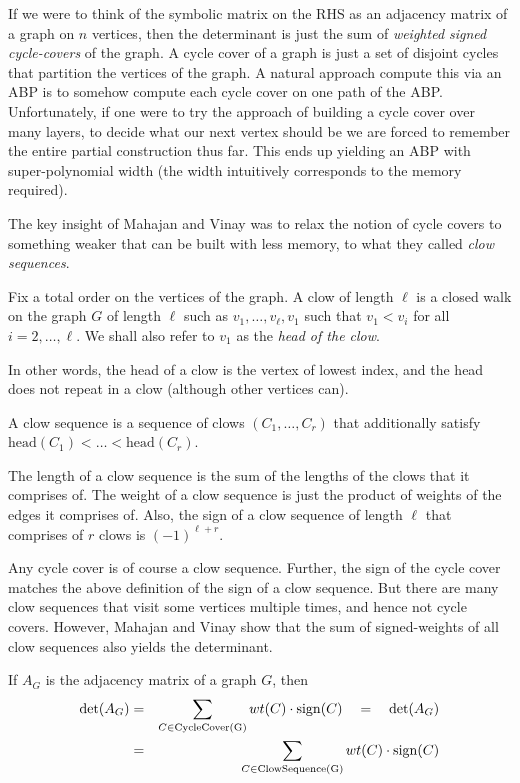 If we were to think of the symbolic matrix on the RHS as an adjacency matrix of a graph on $n$ vertices, then the determinant is just the sum of \emph{weighted signed cycle-covers} of the graph. A cycle cover of a graph is just a set of disjoint cycles that partition the vertices of the graph. A natural approach compute this via an ABP is to somehow compute each cycle cover on one path of the ABP. Unfortunately, if one were to try the \naive approach of building a cycle cover over many layers, to decide what our next vertex should be we are forced to remember the entire partial construction thus far. This ends up yielding an ABP with super-polynomial width (the width intuitively corresponds to the memory required). 

The key insight of Mahajan and Vinay was to relax the notion of cycle covers to something weaker that can be built with less memory, to what they called \emph{clow sequences}. 

\begin{definition}
Fix a total order on the vertices of the graph. A clow  of length $\ell$ is a closed walk on the graph $G$ of length $\ell$ such as $v_1,\dots, v_\ell,v_1$ such that $v_1 < v_i$ for all $i=2,\dots, \ell$. We shall also refer to $v_1$ as the \emph{head of the clow}. 

In other words, the head of a clow is the vertex of lowest index, and the head does not repeat in a clow (although other vertices can). 

A clow sequence is a sequence of clows $(C_1,\dots, C_r)$ that additionally satisfy $\mathrm{head}(C_1) < \dots < \mathrm{head}(C_r)$. 

The length of a clow sequence is the sum of the lengths of the clows that it comprises of. The weight of a clow sequence is just the product of weights of the edges it comprises of. Also, the sign of a clow sequence of length $\ell$ that comprises of $r$ clows is $(-1)^{\ell + r}$. 
\end{definition}

Any cycle cover is of course a clow sequence. Further, the sign of the cycle cover matches the above definition of the sign of a clow sequence. But there are many clow sequences that visit some vertices multiple times, and hence not cycle covers. However, Mahajan and Vinay show that the sum of signed-weights of all clow sequences also yields the determinant. 

\begin{theorem}[\cite{mv97}] If $A_G$ is the adjacency matrix of a graph $G$, then
\begin{eqnarray*}
\det(A_G) & = &  \sum_{C \in \mathrm{CycleCover(G)}} wt(C) \cdot \mathrm{sign}(C) \quad = \quad \det(A_G)\\
& = & \sum_{C \in \mathrm{ClowSequence(G)}} wt(C) \cdot \mathrm{sign}(C)
\end{eqnarray*}
\end{theorem}

